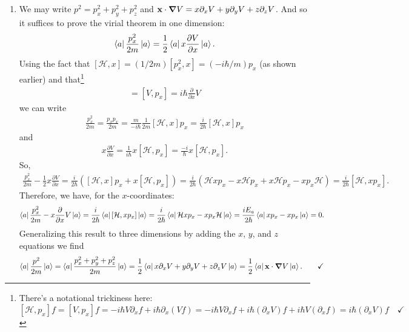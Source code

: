 \documentclass{article}
\theoremstyle{definition}
\newcommand{\p}{\partial}
\newcommand{\ham}{\mathcal{H}}
\newcommand{\f}[2]{\frac{#1}{#2}}
\newcommand{\lp}{\left(}
\newcommand{\rp}{\right)}
\begin{document}
\begin{enumerate}[label=(\alph*)]
	
	\item We may write $p^2 = p_x^2 + p_y^2 + p_z^2$ and $\mathbf{x}\cdot \grad V = x \p_x V + y\p_y V + z\p_z V$. And so it suffices to prove the virial theorem in one dimension:
	\begin{align*}
	\bra{a} \f{p_x^2}{2m} \ket{a} = \f{1}{2}\bra{a} x \f{\p V}{\p x} \ket{a}.
	\end{align*}
	Using the fact that $[\ham,x] = (1/2m)[p_x^2,x]= (-i\hbar/m) p_x$ (as shown earlier) and that\footnote{There's a notational trickiness here: $[\ham,p_x]f = [V,p_x]f = -i\hbar  V\p_x f + i\hbar \p_x(Vf) = -i\hbar  V\p_x f + i\hbar ( \p_x V)f + i\hbar V (\p_x f) = i\hbar (\p_x V)f \quad \checkmark$}
	\begin{align*}
	[\ham,p_x] = [V,p_x] = i\hbar \f{\p}{\p x} V
	\end{align*}
	we can write
	\begin{align*}
	\f{p^2_x}{2m} = \f{p_xp_x}{2m} = \f{m}{-i\hbar}\f{1}{2m}[\ham, x]p_x = \f{i}{2\hbar}[\ham,x]p_x
	\end{align*}
	and 
	\begin{align*}
	x\f{\p V}{\p x} = \f{1}{i\hbar }x [\ham,p_x] = \f{-i}{\hbar}x[\ham,p_x].
	\end{align*}
	So, 
	\begin{align*}
	\f{p_x^2}{2m} - \f{1}{2} x\f{\p V}{\p x} = \f{i}{2\hbar}\lp [\ham, x]p_x + x[\ham,p_x] \rp =
	\f{i}{2\hbar}(\ham x p_x - x\ham p_x + x\ham p_x - xp_x \ham) = \f{i}{2\hbar}[\ham, xp_x].
	\end{align*}
	Therefore, we have, for the $x$-coordinates:
	\begin{align*}
	\bra{a}  \f{p_x^2}{2m} - x\f{\p}{\p x}V  \ket{a} = \f{i}{2\hbar}\bra{a}[\ham,xp_x] \ket{a} =  \f{i}{2\hbar}\bra{a} \ham xp_x - xp_x \ham \ket{a} = \f{iE_a}{2\hbar}\bra{a} xp_x - xp_x \ket{a} = 0.
	\end{align*}
	Generalizing this result to three dimensions by adding the $x$, $y$, and $z$ equations we find
	\begin{align*}
	\bra{a} \f{p^2}{2m} \ket{a} = \bra{a} \f{p_x^2 + p_y^2 + p_z^2}{2m} \ket{a} = \f{1}{2}\bra{a} x\p_x V + y\p_y V + z \p_z V \ket{a} = \f{1}{2}\bra{a} \mathbf{x}\cdot \grad V \ket{a}. \quad\quad\checkmark
	\end{align*}
\end{enumerate}
\end{document}
